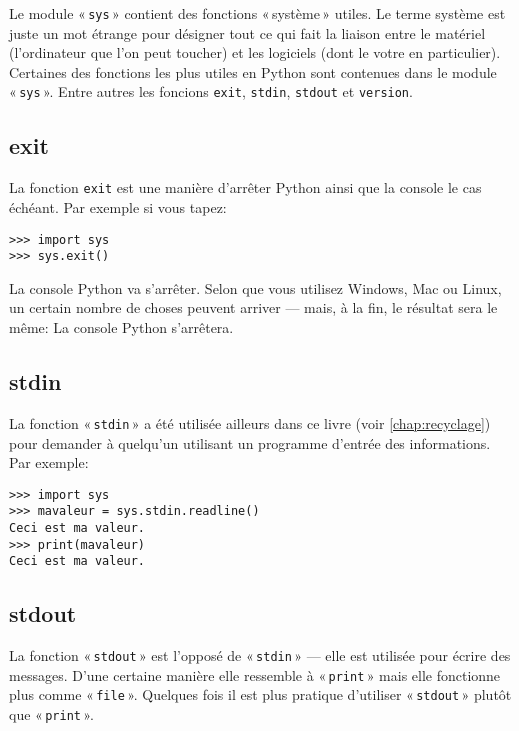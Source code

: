Le module « \verb+sys+ » contient des fonctions « système » utiles. Le terme système est juste un mot étrange pour désigner tout ce qui fait la liaison entre le matériel (l'ordinateur que l'on peut toucher) et les logiciels (dont le votre en particulier). Certaines des fonctions les plus utiles en Python sont contenues dans le module « \texttt{sys} ». Entre autres les foncions \verb+exit+, \verb+stdin+, \verb+stdout+ et \verb+version+.
\subsection{exit}

La fonction \verb+exit+ est une manière d'arrêter Python ainsi que la console le cas échéant. Par exemple si vous tapez:

\begin{Verbatim}[frame=single,rulecolor=\color{gray}]
>>> import sys
>>> sys.exit()
\end{Verbatim}

La console Python va s'arrêter. Selon que vous utilisez Windows, Mac ou Linux, un certain nombre de choses peuvent arriver --- mais, à la fin, le résultat sera le même: La console Python s'arrêtera.
\subsection{stdin}

La fonction « \verb+stdin+ » a été utilisée ailleurs dans ce livre (voir \autoref{chap:recyclage}) pour demander à quelqu'un utilisant un programme d'entrée des informations. Par exemple:

\begin{Verbatim}[frame=single,rulecolor=\color{gray}]
>>> import sys
>>> mavaleur = sys.stdin.readline()
Ceci est ma valeur.
>>> print(mavaleur)
Ceci est ma valeur.
\end{Verbatim}
\subsection{stdout}

La fonction « \verb+stdout+ » est l'opposé de « \texttt{stdin} » --- elle est utilisée pour écrire des messages. D'une certaine manière elle ressemble à « \texttt{print} » mais elle fonctionne plus comme « \texttt{file} ». Quelques fois il est plus pratique d'utiliser « \texttt{stdout} » plutôt que « \texttt{print} ».

